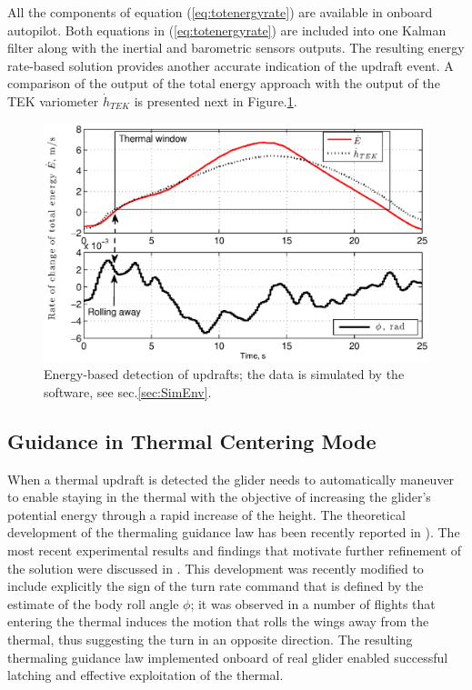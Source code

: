 \documentclass{ifacconf}
\newcommand{\squeezeup}{\vspace{-2.0mm}}
\begin{document}
All the components of equation (\ref{eq:totenergyrate}) are available in
onboard autopilot. Both equations in (\ref{eq:totenergyrate}) are included
into one Kalman filter along with the inertial and barometric sensors
outputs. The resulting energy rate-based solution provides another accurate
indication of the updraft event. A comparison of the output of the total
energy approach with the output of the TEK variometer $\dot{h}_{TEK}$ is
presented next in Figure.\ref{fig:ThermalDetection}.
\begin{figure}[thpb]
  \centering
  \includegraphics[scale=0.44]{Figures/TEK_Bank.eps}
  \caption{Energy-based detection of updrafts; the data is simulated
  by the~\cite{Condor:2013:Online} software, see sec.\ref{sec:SimEnv}.}
  \label{fig:ThermalDetection}
\end{figure}

\subsection{Guidance in Thermal Centering Mode}
\label{subsec:ThermGuidance}
\squeezeup

When a thermal updraft is detected the glider needs to automatically maneuver to enable
staying in the thermal with the objective of increasing the glider's potential energy
through a rapid increase of the height. The theoretical development of the thermaling
guidance law has been recently reported in \cite{AKlass_JGCD:2012}). The most recent
experimental results and findings that motivate further refinement of the solution were
discussed in \cite{AKlass_CDC:2012}. This development was recently modified to include
explicitly the sign of the turn rate command that is defined by the estimate of the body
roll angle $\phi$; it was observed in a number of flights that entering the thermal
induces the motion that rolls the wings away from the thermal, thus suggesting the turn
in an opposite direction. The resulting thermaling guidance law implemented onboard of
real glider enabled successful latching and effective exploitation of the thermal.
\end{document}
